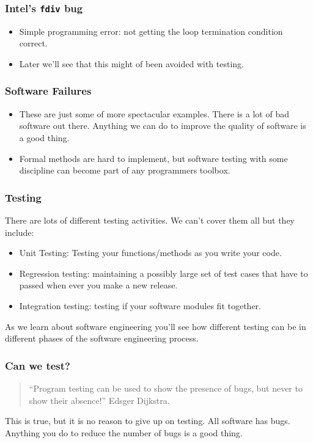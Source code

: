 \documentclass{beamer}
\begin{document}
\begin{frame}
  \frametitle{Intel's {\tt fdiv} bug}
  \begin{itemize}
  \item Simple programming error: not getting the loop termination
    condition correct.
  \item Later we'll see that this might of been avoided with testing.
  \end{itemize}
\end{frame}
\begin{frame}
  \frametitle{Software Failures}
  \begin{itemize}
  \item These are just some of more spectacular examples. There is
    a lot of bad software out there. Anything we can do to
    improve the quality of software is a good thing. 
  \item  Formal methods are hard to implement, but
    software testing with some discipline can become part of any
    programmers toolbox.
  \end{itemize}
\end{frame}
\begin{frame}
  \frametitle{Testing}
  There are lots of different testing activities. We can't cover them
  all but they include:
  \begin{itemize}
  \item Unit Testing: Testing your functions/methods as you write your
    code.
  \item Regression testing: maintaining a possibly large set of test
    cases that have to passed when ever you make a new release.
  \item Integration testing: testing  if your software modules fit
    together. 
  \end{itemize}
As we learn about software engineering you'll see how different
testing can be in different phases of the software engineering
process. 
\end{frame}
\begin{frame}
  \frametitle{Can we test?}
  
  \begin{quote}
    ``Program testing can be used to show the presence of bugs, but
    never to show their absence!'' Edsger Dijkstra.
  \end{quote}


This is true, but it is no reason to give up on testing. All software has
bugs. Anything you do to reduce the number of bugs is a good thing.
\end{frame}
\end{document}
